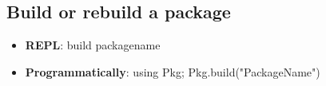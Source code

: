 \documentclass{report}
\begin{document}
     \bigbreak \noindent 
     \subsection{Build or rebuild a package}
     \begin{itemize}
        \item \textbf{REPL}: build packagename
         \item \textbf{Programmatically}: using Pkg; Pkg.build("PackageName")
     \end{itemize}


































    
\end{document}
